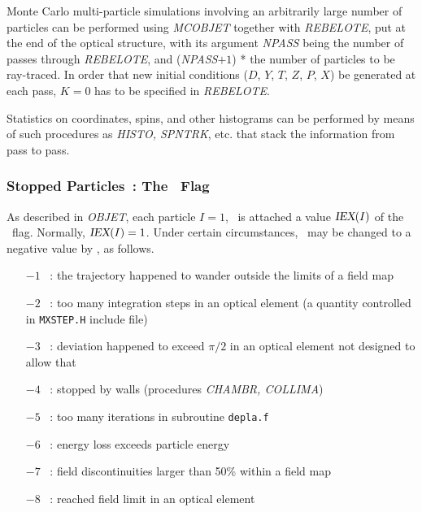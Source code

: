 {Monte Carlo  multi-particle simulations involving an 
arbitrarily large number of particles
can be performed using  \textsl{MCOBJET} together with \textsl{REBELOTE}, put at the end of the optical
structure, with its argument \textsl{NPASS} being the number of passes through 
\textsl{REBELOTE}, and (\textsl{NPASS}$+ 1$) * \IMAX{}  
the number of particles to 
be ray-traced. In order that new initial conditions  ($D$, $Y$, $T$, $Z$, 
$P$, $X$) 
 be generated at each pass, $ K=0 $ has to be specified in \textsl{REBELOTE}.
 
\noindent Statistics on coordinates, spins, and other histograms can be
performed by means of such procedures as \textsl{HISTO, SPNTRK}, 
etc. that stack the information from pass to pass. 


\subsubsection{Stopped Particles~: The \IEX\ Flag} 
\label{sec4.6.6}

As described in \textsl{OBJET}, each particle $I=1$, \IMAX\
 is attached a
value $\textsl{IEX}(I)$ of the \IEX\ flag. Normally, $\textsl{IEX}(I)=1$. Under certain 
circumstances, \IEX\ may be changed to a negative value by \zgoubi, as follows. 

\begin{itemize}
\item[$-1$]~:  the trajectory happened to wander outside the limits of a field map 
\item[$-2$]~:  too many integration steps\index{integration step size} in an optical element (a quantity controlled in 
\texttt{MXSTEP.H} include file)
\item[$-3$]~:  deviation happened to exceed $\pi / 2 $ in an optical element not designed to allow that
\item[$-4$]~:  stopped by walls (procedures \textsl{CHAMBR, COLLIMA})  
\item[$-5$]~:  too many iterations in subroutine \texttt{depla.f}  
\item[$-6$]~:  energy loss exceeds particle energy 
\item[$-7$]~:  field discontinuities larger than 50\% within a field map
\item[$-8$]~:  reached field limit in an optical element
\end{itemize}


}
